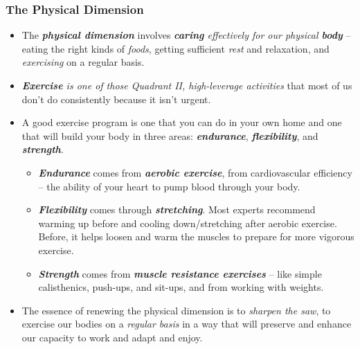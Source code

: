 \documentclass[11pt]{article}
\begin{document}
\subsubsection{The Physical Dimension}
\begin{itemize}
\item The \emph{\textbf{physical dimension}} involves \emph{\textbf{caring} effectively for our physical \textbf{body}} -- eating the right kinds of \emph{foods}, getting sufficient \emph{rest} and relaxation, and \emph{exercising} on a regular basis.

\item \emph{\textbf{Exercise} is one of those Quadrant II, high-leverage activities} that most of us don't do consistently because it isn't urgent.

\item A good exercise program is one that you can do in your own home and one that will build your body in three areas: \emph{\textbf{endurance}}, \emph{\textbf{flexibility}}, and \emph{\textbf{strength}}.
\begin{itemize}
\item \emph{\textbf{Endurance}} comes from \emph{\textbf{aerobic exercise}}, from cardiovascular efficiency -- the ability of your heart to pump blood through your body.

\item \emph{\textbf{Flexibility}} comes through \emph{\textbf{stretching}}. Most experts recommend warming up before and cooling down/stretching after aerobic exercise. Before, it helps loosen and warm the muscles to prepare for more vigorous exercise.

\item \emph{\textbf{Strength}} comes from \emph{\textbf{muscle resistance exercises}} -- like simple calisthenics, push-ups, and sit-ups, and from working with weights. 
\end{itemize}

\item The essence of renewing the physical dimension is to \emph{sharpen the saw}, to exercise our bodies on a \emph{regular basis} in a way that will preserve and enhance our capacity to work and adapt and enjoy.
\end{itemize}
\end{document}

